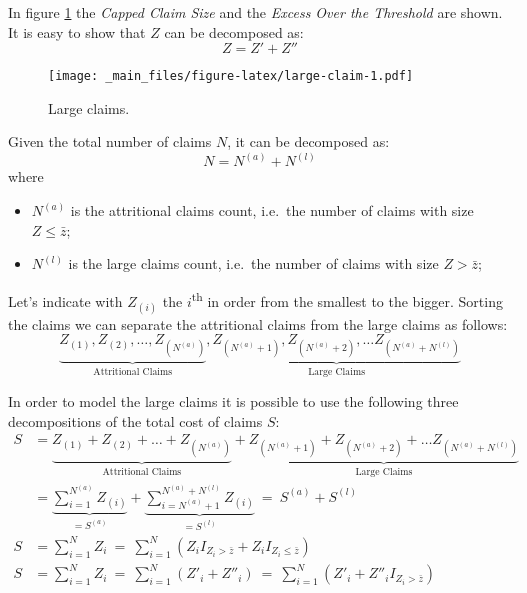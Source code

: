 \documentclass[a4paper, nobind]{templates/ociamthesis}
\providecommand{\tightlist}{%
  \setlength{\itemsep}{0pt}\setlength{\parskip}{0pt}}
\theoremstyle{definition}
\theoremstyle{definition}
\theoremstyle{definition}
\theoremstyle{remark}
\begin{document}
In figure \ref{fig:large-claim} the \emph{Capped Claim Size} and the \emph{Excess Over the Threshold} are shown. It is easy to show that \(Z\) can be decomposed as:
\[Z = Z' + Z''\]

\begin{figure}
\centering
\texttt{[image: \_main\_files/figure-latex/large-claim-1.pdf]}
\caption{\label{fig:large-claim}Large claims.}
\end{figure}

Given the total number of claims \(N\), it can be decomposed as:
\[N = N^{(a)} + N^{(l)}\]
where

\begin{itemize}
\tightlist
\item
  \(N^{(a)}\) is the attritional claims count, i.e.~the number of claims with size \(Z \le \bar{z}\);
\item
  \(N^{(l)}\) is the large claims count, i.e.~the number of claims with size \(Z > \bar{z}\);
\end{itemize}

Let's indicate with \(Z_{(i)}\) the \(i\)\textsuperscript{th} in order from the smallest to the bigger. Sorting the claims we can separate the attritional claims from the large claims as follows:
\[
\underbrace{Z_{(1)}, Z_{(2)}, \dots, Z_{(N^{(a)})}}_{\text{Attritional Claims}},
\underbrace{Z_{(N^{(a)} + 1)}, Z_{(N^{(a)} + 2)}, \dots Z_{(N^{(a)} + N^{(l)})}}_{\text{Large Claims}}
\]

In order to model the large claims it is possible to use the following three decompositions of the total cost of claims \(S\):
\begin{align}
  \nonumber
  S & = \underbrace{Z_{(1)} + Z_{(2)} + \dots + Z_{(N^{(a)})}}_{\text{Attritional Claims}} +
        \underbrace{Z_{(N^{(a)} + 1)} + Z_{(N^{(a)} + 2)} + \dots Z_{(N^{(a)} + N^{(l)})}}_{\text{Large Claims}} \\
  \label{large-claim-decomposition-1}
    & = \underbrace{\sum_{i=1}^{N^{(a)}}{Z_{(i)}}}_{=S^{(a)}} +
            \underbrace{\sum_{i = N^{(a)} + 1}^{N^{(a)} + N^{(l)}}{Z_{(i)}}}_{=S^{(l)}}
    \ = \ S^{(a)} + S^{(l)} \\[12pt]
  \label{large-claim-decomposition-2}
  S & = \sum_{i=1}^{N}{Z_i}
    \ = \ \sum_{i=1}^{N}{\left(
      Z_i I_{Z_i>\bar{z}} +
      Z_i I_{Z_i\le\bar{z}}
      \right)} \\[12pt]
  \label{large-claim-decomposition-3}
  S & = \sum_{i=1}^{N}{Z_i}
    \ = \ \sum_{i=1}^{N}{\left(Z'_i + Z''_i\right)}
    \ = \ \sum_{i=1}^{N}{\left(Z'_i + Z''_i I_{Z_i > \bar{z}}\right)}
\end{align}
\end{document}
